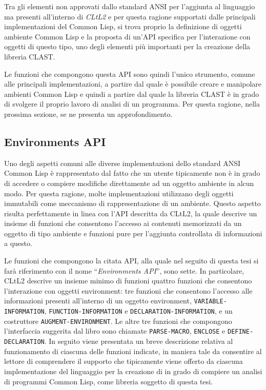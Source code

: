 Tra gli elementi non approvati dallo standard ANSI per l’aggiunta al linguaggio
ma presenti all’interno di \textit{CLtL2} e per questa ragione supportati dalle
principali implementazioni del Common Lisp, si trova proprio la definizione di
oggetti ambiente Common Lisp e la proposta di un'API specifica per l’interazione
con  oggetti di questo tipo, uno degli elementi più importanti per la creazione
della libreria CLAST.

Le funzioni che compongono questa API sono quindi l'unico strumento, comune alle
principali implementazioni, a partire dal quale è possibile creare e manipolare
ambienti Common Lisp e quindi a partire dal quale la libreria CLAST è in grado
di svolgere il proprio lavoro di analisi di un programma. Per questa ragione,
nella prossima sezione, se ne presenta un approfondimento.

\subsection{Environments API}

Uno degli aspetti comuni alle diverse implementazioni dello standard ANSI Common
Lisp è rappresentato dal fatto che un utente tipicamente non è in grado di
accedere o compiere modifiche direttamente ad un oggetto ambiente in alcun modo.
Per questa ragione, molte implementazioni utilizzano degli oggetti immutabili
come meccanismo di rappresentazione di un ambiente. Questo aspetto risulta
perfettamente in linea con l’API descritta da CLtL2, la quale descrive un
insieme di funzioni che consentono l’accesso ai contenuti memorizzati da un
oggetto di tipo ambiente e funzioni pure per l’aggiunta controllata di
informazioni a questo.

Le funzioni che compongono la citata API, alla quale nel seguito di questa tesi
si farà riferimento con il nome \enquote{\textit{Environments API}}, sono sette.
In particolare, CLtL2 descrive un insieme minimo di funzioni quattro funzioni
che consentono l’interazione con oggetti environment: tre funzioni che
consentono l’accesso alle informazioni presenti all’interno di un oggetto
environment, \texttt{VARIABLE-INFORMATION}, \texttt{FUNCTION-INFORMATION} e
\texttt{DECLARATION-INFORMATION}, e un costruttore
\texttt{AUGMENT-ENVIRONMENT}. Le altre tre funzioni che compongono l’interfaccia
suggerita dal libro sono chiamate \texttt{PARSE-MACRO}, \texttt{ENCLOSE} e
\texttt{DEFINE-DECLARATION}. In seguito viene presentata un breve descrizione
relativa al funzionamento di ciascuna delle funzioni indicate, in maniera tale
da consentire al lettore di comprendere il supporto che tipicamente viene
offerto da ciascuna implementazione del linguaggio per la creazione di in grado
di compiere un analisi di programmi Common Lisp, come libreria soggetto di
questa tesi.

